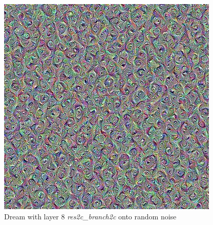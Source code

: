 \begin{figure}[H]
	\includegraphics[width=1\linewidth]{img/rotated_feature_2.jpg}
	\caption{Dream with layer 8 \emph{res2c\_branch2c} onto random noise}
	\label{fig:rotated_feature_2}
	\endminipage\hfill
\end{figure}

